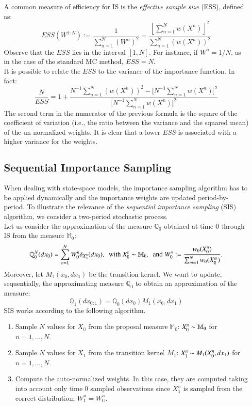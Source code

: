 \documentclass[
]{book}
\theoremstyle{break}
\theoremstyle{nonumberplain}
\begin{document}
A common measure of efficiency for IS is the
\textit{effective sample size} (ESS), defined as: \begin{equation*}
    ESS(W^{1:N}):=\frac{1}{\sum_{n=1}^N(W^n)^2}=\frac{[\sum_{n=1}^N w(X^n)]^2}{\sum_{n=1}^N(w(X^n))^2}
\end{equation*} Observe that the \(ESS\) lies in the interval \([1,N]\).
For instance, if \(W^n=1/N\), as in the case of the standard MC method,
\(ESS=N\).\\
It is possible to relate the \(ESS\) to the variance of the importance
function. In fact: \begin{equation*}
    \frac{N}{ESS}=1+\frac{N^{-1}\sum_{n=1}^N(w(X^n))^2-\big[N^{-1}\sum_{n=1}^N w(X^n)\big]^2}{\big[N^{-1}\sum_{n=1}^N w(X^n)\big]^2}
\end{equation*} The second term in the numerator of the previous formula
is the square of the coefficient of variation (i.e., the ratio between
the variance and the squared mean) of the un-normalized weights. It is
clear that a lower \(ESS\) is associated with a higher variance for the
weights.

\subsection{Sequential Importance Sampling}

When dealing with state-space models, the importance sampling algorithm
has to be applied dynamically and the importance weights are updated
period-by-period. To illustrate the relevance of the
\textit{sequential importance sampling} (SIS) algorithm, we consider a
two-period stochastic process.~\\
Let us consider the approximation of the measure \(\mathbb Q_0\)
obtained at time 0 through IS from the measure \(\mathbb M_0\):
\begin{equation*}
    \mathbb Q_0^N(dx_0)=\sum_{n=1}^NW_0^n\delta_{X_0^n}(dx_0),~~\text{with } X_0^n\thicksim \mathbb M_0,~~\text{and }  W_0^n:=\frac{w_0(X_0^n)}{\sum_{m=1}^Nw_0(X_0^m)}.
\end{equation*} Moreover, let \(M_1(x_0,dx_1)\) be the transition
kernel. We want to update, sequentially, the approximating measure
\(\mathbb Q_0\) to obtain an approximation of the measure:
\begin{equation*}
    \mathbb Q_{1}(dx_{0:1})=\mathbb Q_0(dx_0)M_1(x_0,dx_1)
\end{equation*} SIS works according to the following algorithm.

\begin{enumerate}
    \item Sample $N$ values for $X_0$ from the proposal measure $\mathbb M_0$: $X_0^n\thicksim \mathbb M_0$ for $n=1,...,N$.
    \item Sample $N$ values for $X_1$ from the transition kernel $M_1$: $X_1^n\thicksim M_1(X_0^n,dx_1)$ for $n=1,...,N$.
    \item Compute the auto-normalized weights. In this case, they are computed taking into account only time 0 sampled observations since $X_1^n$ is sampled from the correct distribution: $W_1^n=W_0^n$.
\end{enumerate}
\end{document}
